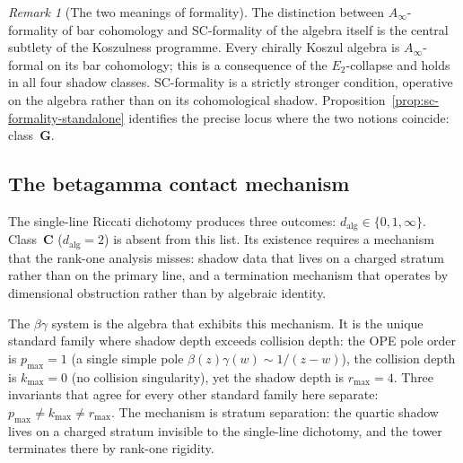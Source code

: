 \documentclass[11pt]{article}
\theoremstyle{plain}
\theoremstyle{definition}
\theoremstyle{remark}
\newtheorem{remark}[theorem]{Remark}
\begin{document}
\begin{remark}[The two meanings of formality]
\label{rem:sc-vs-ainfty-standalone}
The distinction between $A_\infty$-formality of bar cohomology
and SC-formality of the algebra itself is the central subtlety
of the Koszulness programme. Every chirally Koszul algebra is
$A_\infty$-formal on its bar cohomology; this is a consequence of
the $E_2$-collapse and holds in all four shadow classes.
SC-formality is a strictly stronger condition, operative on the
algebra rather than on its cohomological shadow.
Proposition~\ref{prop:sc-formality-standalone} identifies the
precise locus where the two notions coincide: class~$\mathbf{G}$.
\end{remark}


\subsection{The betagamma contact mechanism}
\label{ssec:betagamma-contact}

The single-line Riccati dichotomy produces three outcomes:
$d_{\mathrm{alg}} \in \{0, 1, \infty\}$. Class~$\mathbf{C}$
($d_{\mathrm{alg}} = 2$) is absent from this list. Its
existence requires a mechanism that the rank-one analysis
misses: shadow data that lives on a charged stratum rather
than on the primary line, and a termination mechanism that
operates by dimensional obstruction rather than by
algebraic identity.

The $\beta\gamma$ system is the algebra that exhibits this
mechanism. It is the unique standard family where shadow depth
exceeds collision depth: the OPE pole order is $p_{\max} = 1$
(a single simple pole $\beta(z)\gamma(w) \sim 1/(z{-}w)$), the
collision depth is $k_{\max} = 0$ (no collision singularity),
yet the shadow depth is $r_{\max} = 4$. Three invariants that
agree for every other standard family here separate:
$p_{\max} \neq k_{\max} \neq r_{\max}$. The mechanism is
stratum separation: the quartic shadow lives on a charged
stratum invisible to the single-line dichotomy, and the tower
terminates there by rank-one rigidity.
\end{document}
